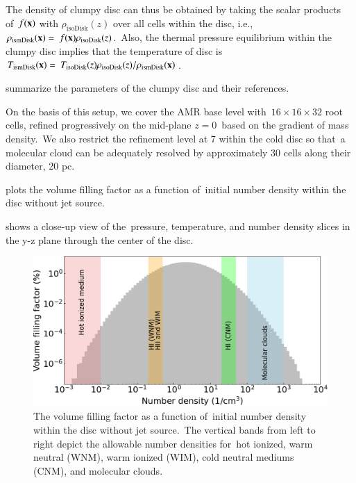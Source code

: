 \documentclass[twocolumn]{aastex631}
\begin{document}
  The density of clumpy disc can thus be obtained by taking the scalar products of\
  $f(\bold{x})$ with $\rho_{\text{isoDisk}}(z)$ over all cells within the disc, i.e.,\
  $\displaystyle\rho_{\text{ismDisk}}(\bold{x}) =\
  f(\bold{x}) \rho_{\text{isoDisk}}(z)$.\
  Also, the thermal pressure equilibrium within the clumpy disc implies that the temperature of disc is
  $\displaystyle T_{\text{ismDisk}}(\bold{x}) =\
  T_{\text{isoDisk}}(z)\rho_{\text{isoDisk}}(z)/\rho_{\text{ismDisk}}(\bold{x})$.


  \Cref{table-parameters} summarize the parameters of the clumpy disc and their references.

  On the basis of this setup, we cover the AMR base level with\
  $16\times16\times32$ root cells, refined progressively on the mid-plane $z=0$\
  based on the gradient of mass density.\
  We also restrict the refinement level at 7 within the cold disc so that\
  a molecular cloud can be adequately resolved by approximately 30 cells along their diameter, 20 pc.

   plots the volume filling factor as a function of\
  initial number density within the disc without jet source.\

   shows a close-up view of the\
  pressure, temperature, and number density slices
  in the y-z plane through the center of the disc.

  \begin{figure}
      \includegraphics[width=\columnwidth]{figures/fig__numberDensityHistogram.png}
    \caption{The volume filling factor as a function of\
             initial number density within the disc without jet source.\
             The vertical bands from left to right depict the allowable number densities \citep{peak-ism-density} for\
             hot ionized, warm neutral (WNM), warm ionized (WIM), cold neutral mediums (CNM), and molecular clouds.}
      \label{fig__numberDensityHistogram}
  \end{figure}
\end{document}
